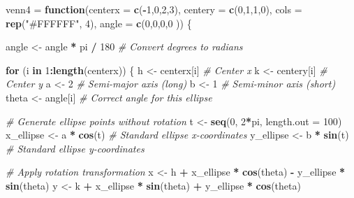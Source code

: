 \documentclass[
]{article}
\newenvironment{Shaded}{\begin{snugshade}}{\end{snugshade}}
\newcommand{\AttributeTok}[1]{\textcolor[rgb]{0.13,0.29,0.53}{#1}}
\newcommand{\CommentTok}[1]{\textcolor[rgb]{0.56,0.35,0.01}{\textit{#1}}}
\newcommand{\ControlFlowTok}[1]{\textcolor[rgb]{0.13,0.29,0.53}{\textbf{#1}}}
\newcommand{\DecValTok}[1]{\textcolor[rgb]{0.00,0.00,0.81}{#1}}
\newcommand{\FunctionTok}[1]{\textcolor[rgb]{0.13,0.29,0.53}{\textbf{#1}}}
\newcommand{\NormalTok}[1]{#1}
\newcommand{\OtherTok}[1]{\textcolor[rgb]{0.56,0.35,0.01}{#1}}
\newcommand{\SpecialCharTok}[1]{\textcolor[rgb]{0.81,0.36,0.00}{\textbf{#1}}}
\newcommand{\StringTok}[1]{\textcolor[rgb]{0.31,0.60,0.02}{#1}}
\begin{document}
\begin{Shaded}
\begin{Highlighting}[]
\NormalTok{venn4 }\OtherTok{=} \ControlFlowTok{function}\NormalTok{(}\AttributeTok{centerx =} \FunctionTok{c}\NormalTok{(}\SpecialCharTok{{-}}\DecValTok{1}\NormalTok{,}\DecValTok{0}\NormalTok{,}\DecValTok{2}\NormalTok{,}\DecValTok{3}\NormalTok{), }
                 \AttributeTok{centery =} \FunctionTok{c}\NormalTok{(}\DecValTok{0}\NormalTok{,}\DecValTok{1}\NormalTok{,}\DecValTok{1}\NormalTok{,}\DecValTok{0}\NormalTok{), }
                 \AttributeTok{cols =} \FunctionTok{rep}\NormalTok{(}\StringTok{"\#FFFFFF"}\NormalTok{, }\DecValTok{4}\NormalTok{), }
                 \AttributeTok{angle =} \FunctionTok{c}\NormalTok{(}\DecValTok{0}\NormalTok{,}\DecValTok{0}\NormalTok{,}\DecValTok{0}\NormalTok{,}\DecValTok{0}\NormalTok{ )) \{   }
  
\NormalTok{  angle }\OtherTok{\textless{}{-}}\NormalTok{ angle }\SpecialCharTok{*}\NormalTok{ pi }\SpecialCharTok{/} \DecValTok{180}  \CommentTok{\# Convert degrees to radians}

  \ControlFlowTok{for}\NormalTok{ (i }\ControlFlowTok{in} \DecValTok{1}\SpecialCharTok{:}\FunctionTok{length}\NormalTok{(centerx)) \{}
\NormalTok{    h }\OtherTok{\textless{}{-}}\NormalTok{ centerx[i]  }\CommentTok{\# Center x}
\NormalTok{    k }\OtherTok{\textless{}{-}}\NormalTok{ centery[i]  }\CommentTok{\# Center y}
\NormalTok{    a }\OtherTok{\textless{}{-}} \DecValTok{2}  \CommentTok{\# Semi{-}major axis (long)}
\NormalTok{    b }\OtherTok{\textless{}{-}} \DecValTok{1}  \CommentTok{\# Semi{-}minor axis (short)}
\NormalTok{    theta }\OtherTok{\textless{}{-}}\NormalTok{ angle[i]  }\CommentTok{\# Correct angle for this ellipse}

    \CommentTok{\# Generate ellipse points without rotation}
\NormalTok{    t }\OtherTok{\textless{}{-}} \FunctionTok{seq}\NormalTok{(}\DecValTok{0}\NormalTok{, }\DecValTok{2}\SpecialCharTok{*}\NormalTok{pi, }\AttributeTok{length.out =} \DecValTok{100}\NormalTok{)}
\NormalTok{    x\_ellipse }\OtherTok{\textless{}{-}}\NormalTok{ a }\SpecialCharTok{*} \FunctionTok{cos}\NormalTok{(t)  }\CommentTok{\# Standard ellipse x{-}coordinates}
\NormalTok{    y\_ellipse }\OtherTok{\textless{}{-}}\NormalTok{ b }\SpecialCharTok{*} \FunctionTok{sin}\NormalTok{(t)  }\CommentTok{\# Standard ellipse y{-}coordinates}
    
    \CommentTok{\# Apply rotation transformation}
\NormalTok{    x }\OtherTok{\textless{}{-}}\NormalTok{ h }\SpecialCharTok{+}\NormalTok{ x\_ellipse }\SpecialCharTok{*} \FunctionTok{cos}\NormalTok{(theta) }\SpecialCharTok{{-}}\NormalTok{ y\_ellipse }\SpecialCharTok{*} \FunctionTok{sin}\NormalTok{(theta)}
\NormalTok{    y }\OtherTok{\textless{}{-}}\NormalTok{ k }\SpecialCharTok{+}\NormalTok{ x\_ellipse }\SpecialCharTok{*} \FunctionTok{sin}\NormalTok{(theta) }\SpecialCharTok{+}\NormalTok{ y\_ellipse }\SpecialCharTok{*} \FunctionTok{cos}\NormalTok{(theta)}
  

\end{Highlighting}
\end{Shaded}
\end{document}

